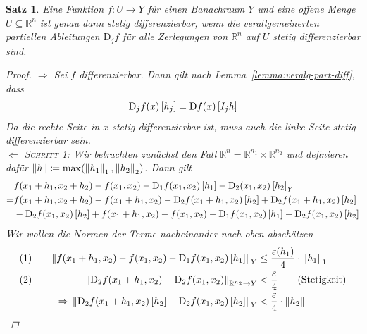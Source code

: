 \documentclass[11pt, twoside, a4paper]{article}
\theoremstyle{plain}
\newtheorem{satz}[blockelement]{Satz}
\numberwithin{equation}{subsection}
\newcommand{\of}[1]{\mathopen{}\mathclose{}\bgroup\left(#1\aftergroup\egroup\right)}
\newcommand{\norm}[1]{\left\lVert#1\right\rVert}
\newcommand{\interv}[1]{\left[#1\right]}
\newcommand{\impl}[0]{\Rightarrow{}}
\newcommand{\fromto}{\rightarrow{}}
\newcommand{\anf}[1]{\glqq{}#1\grqq}
\DeclareMathOperator{\D}{D\!}
\newcommand{\R}{\mathbb{R}}
\begin{document}
    \begin{satz} %
        \label{satz:diff-krit-veralg-part}
        Eine Funktion $f: U\fromto Y$ für einen Banachraum $Y$ und eine offene Menge $U\subseteq \R^n$ ist genau dann stetig differenzierbar, wenn die verallgemeinerten partiellen Ableitungen $\text{D}_j f$ für alle Zerlegungen von $\R^n$ auf $U$ stetig differenzierbar sind.
        \begin{proof}
            \anf{$\impl$} Sei $f$ differenzierbar. Dann gilt nach Lemma~\ref{lemma:veralg-part-diff}, dass
            \begin{align*}
                \text{D}_j f\of{x}\interv{h_j} = \D f\of{x}\interv{I_j h}
            \end{align*}
            Da die rechte Seite in $x$ stetig differenzierbar ist, muss auch die linke Seite stetig differenzierbar sein.\\[.2\baselineskip]
            \anf{$\Leftarrow$} \textsc{Schritt 1}: Wir betrachten zunächst den Fall $\R^n = \R^{n_1} \times\R^{n_2}$ und definieren dafür $\norm{h}\coloneqq\max\of{\norm{h_1}_1, \norm{h_2}_2}$. Dann gilt
            \begin{align*}
                &f\of{x_1 + h_1, x_2 + h_2} - f\of{x_1, x_2} - \text{D}_1 f\of{x_1, x_2}\interv{h_1} - \text{D}_2\of{x_1, x_2}\interv{h_2}_Y\\
                = &f\of{x_1 + h_1, x_2 + h_2} - f\of{x_1 + h_1, x_2} - \text{D}_2 f\of{x_1+h_1, x_2}\interv{h_2} + \text{D}_2 f\of{x_1 + h_1, x_2}\interv{h_2}\\
                &- \text{D}_2 f\of{x_1, x_2}\interv{h_2} + f\of{x_1 + h_1, x_2} - f\of{x_1, x_2} - \text{D}_1 f\of{x_1, x_2}\interv{h_1} - \text{D}_2 f\of{x_1, x_2}\interv{h_2}
            \end{align*}
            Wir wollen die Normen der Terme nacheinander nach oben abschätzen
            \begin{alignat*}{2}
            (1)
                \quad&&\norm{f\of{x_1 + h_1, x_2} - f\of{x_1, x_2} - \text{D}_1 f\of{x_1, x_2}\interv{h_1}}_Y &\leq \frac{\varepsilon\of{h_1}}{4}\cdot\norm{h_1}_1\\
                (2)\quad&&\norm{\text{D}_2 f\of{x_1 + h_1, x_2} - \text{D}_2 f\of{x_1, x_2}}_{\R^{n_2}\fromto Y} &< \frac{\varepsilon}{4}\tag{Stetigkeit}\\
                &&\impl \norm{\text{D}_2 f\of{x_1 + h_1, x_2}\interv{h_2} - \text{D}_2 f\of{x_1, x_2}\interv{h_2}}_Y &< \frac{\varepsilon}{4}\cdot\norm{h_2}\\

\end{alignat*}
\end{proof}
\end{satz}
\end{document}
